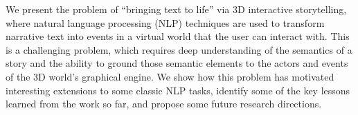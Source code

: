 We present the problem of ``bringing text to life'' via 3D interactive storytelling, where natural language processing (NLP) techniques are used to transform narrative text into events in a virtual world that the user can interact with. This is a challenging problem, which requires deep understanding of the semantics of a story and the ability to ground those semantic elements to the actors and events of the 3D world's graphical engine. We show how this problem has motivated interesting extensions to some classic NLP tasks, identify some of the key lessons learned from the work so far, and propose some future research directions.
